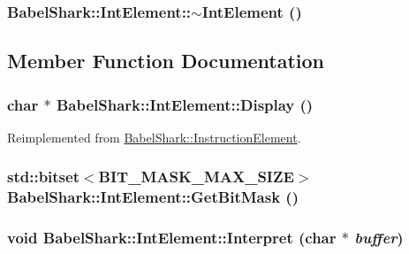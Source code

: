 \hypertarget{class_babel_shark_1_1_int_element_51241ef34578ac87e4b124628a4929ff}{
\subsubsection[{$\sim$IntElement}]{\setlength{\rightskip}{0pt plus 5cm}BabelShark::IntElement::$\sim$IntElement ()}}
\label{class_babel_shark_1_1_int_element_51241ef34578ac87e4b124628a4929ff}




\subsection{Member Function Documentation}
\hypertarget{class_babel_shark_1_1_int_element_c6999927ab0af83714479752fda88f9b}{
\subsubsection[{Display}]{\setlength{\rightskip}{0pt plus 5cm}char $\ast$ BabelShark::IntElement::Display ()}}
\label{class_babel_shark_1_1_int_element_c6999927ab0af83714479752fda88f9b}




Reimplemented from \hyperlink{class_babel_shark_1_1_instruction_element_6c98ad187a2a12399eb90a8cf9e2aec0}{BabelShark::InstructionElement}.\hypertarget{class_babel_shark_1_1_int_element_e91b02a2a8e83f55556d6756c12bf1b5}{
\subsubsection[{GetBitMask}]{\setlength{\rightskip}{0pt plus 5cm}std::bitset$<$BIT\_\-MASK\_\-MAX\_\-SIZE$>$ BabelShark::IntElement::GetBitMask ()}}
\label{class_babel_shark_1_1_int_element_e91b02a2a8e83f55556d6756c12bf1b5}


\hypertarget{class_babel_shark_1_1_int_element_d8467ad7b321f4189f944833ee60990f}{
\subsubsection[{Interpret}]{\setlength{\rightskip}{0pt plus 5cm}void BabelShark::IntElement::Interpret (char $\ast$ {\em buffer})}}
\label{class_babel_shark_1_1_int_element_d8467ad7b321f4189f944833ee60990f}




